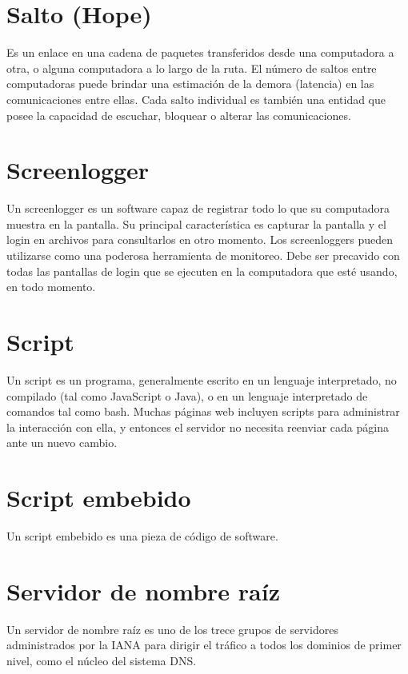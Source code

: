 \documentclass[10pt,a5paper,twoside,,]{book}
\begin{document}
\section{Salto (Hope)}\label{salto-hope}

Es un enlace en una cadena de paquetes transferidos desde una
computadora a otra, o alguna computadora a lo largo de la ruta. El
número de saltos entre computadoras puede brindar una estimación de la
demora (latencia) en las comunicaciones entre ellas. Cada salto
individual es también una entidad que posee la capacidad de escuchar,
bloquear o alterar las comunicaciones.

\section{Screenlogger}\label{screenlogger}

Un screenlogger es un software capaz de registrar todo lo que su
computadora muestra en la pantalla. Su principal característica es
capturar la pantalla y el login en archivos para consultarlos en otro
momento. Los screenloggers pueden utilizarse como una poderosa
herramienta de monitoreo. Debe ser precavido con todas las pantallas de
login que se ejecuten en la computadora que esté usando, en todo
momento.

\section{Script}\label{script}

Un script es un programa, generalmente escrito en un lenguaje
interpretado, no compilado (tal como JavaScript o Java), o en un
lenguaje interpretado de comandos tal como bash. Muchas páginas web
incluyen scripts para administrar la interacción con ella, y entonces el
servidor no necesita reenviar cada página ante un nuevo cambio.

\section{Script embebido}\label{script-embebido}

Un script embebido es una pieza de código de software.

\section{Servidor de nombre raíz}\label{servidor-de-nombre-rauxedz}

Un servidor de nombre raíz es uno de los trece grupos de servidores
administrados por la IANA para dirigir el tráfico a todos los dominios
de primer nivel, como el núcleo del sistema DNS.
\end{document}

